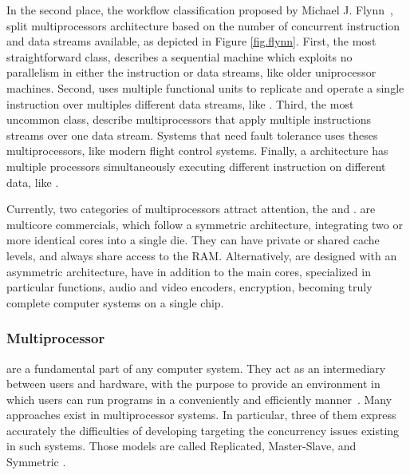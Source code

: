 			In the second place, the workflow classification proposed by Michael J. Flynn~\cite{flynn:1972},
			split multiprocessors architecture based on the number of concurrent
			instruction and data streams available, as depicted in Figure \ref{fig.flynn}.
			First, the most straightforward class, \sisd describes a sequential
			machine which exploits no parallelism in either the instruction or
			data streams, like older uniprocessor machines.
			Second, \simd uses multiple functional units to replicate and operate
			a single instruction over multiples different data streams, like \gpu.
			Third, the most uncommon class, \misd describe multiprocessors that
			apply multiple instructions streams over one data stream.
			Systems that need fault tolerance uses theses multiprocessors, like
			modern flight control systems.
			Finally, a \mimd architecture has multiple processors simultaneously
			executing different instruction on different data, like \xeonphi.

			Currently, two categories of multiprocessors attract attention, the \cmp and \soc.
			\cmps are multicore commercials, which follow a symmetric architecture,
			integrating two or more identical cores into a single die.
			They can have private or shared cache levels, and always share access
			to the RAM.
			Alternatively, \socs are designed with an asymmetric architecture,
			have in addition to the main cores, specialized \cpus in particular
			functions, \eg audio and video encoders, encryption, becoming truly
			complete computer systems on a single chip.

		\subsubsection{Multiprocessor \oses}
		\label{sec.multiprocessor-os}

			\oses are a fundamental part of any computer system.
			They act as an intermediary between users and hardware, with the
			purpose to provide an environment in which users can run programs
			in a conveniently and efficiently manner~\cite{Silberschatz:9ed}.
			Many \os approaches exist in multiprocessor systems.
			In particular, three of them express accurately the difficulties
			of developing \oses targeting the concurrency issues existing in
			such systems.
			Those models are called Replicated, Master-Slave, and Symmetric \os.

